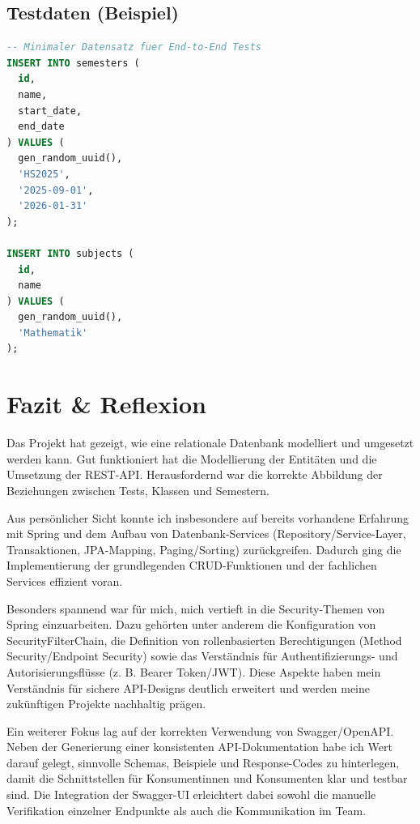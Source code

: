 \documentclass[12pt,a4paper]{article}
\begin{document}
    \subsection{Testdaten (Beispiel)}
    \begin{lstlisting}[language=SQL]
-- Minimaler Datensatz fuer End-to-End Tests
INSERT INTO semesters (
  id,
  name,
  start_date,
  end_date
) VALUES (
  gen_random_uuid(),
  'HS2025',
  '2025-09-01',
  '2026-01-31'
);

INSERT INTO subjects (
  id,
  name
) VALUES (
  gen_random_uuid(),
  'Mathematik'
);
    \end{lstlisting}

    \section{Fazit \& Reflexion}
    Das Projekt hat gezeigt, wie eine relationale Datenbank modelliert und umgesetzt werden kann.
    Gut funktioniert hat die Modellierung der Entitäten und die Umsetzung der REST-API.
    Herausfordernd war die korrekte Abbildung der Beziehungen zwischen Tests, Klassen und Semestern.

    Aus persönlicher Sicht konnte ich insbesondere auf bereits vorhandene Erfahrung mit Spring und
    dem Aufbau von Datenbank-Services (Repository/Service-Layer, Transaktionen, JPA-Mapping,
    Paging/Sorting) zurückgreifen. Dadurch ging die Implementierung der grundlegenden CRUD-Funktionen
    und der fachlichen Services effizient voran.

    Besonders spannend war für mich, mich vertieft in die Security-Themen von Spring einzuarbeiten.
    Dazu gehörten unter anderem die Konfiguration von SecurityFilterChain, die Definition von
    rollenbasierten Berechtigungen (Method Security/Endpoint Security) sowie das Verständnis für
    Authentifizierungs- und Autorisierungsflüsse (z. B. Bearer Token/JWT). Diese Aspekte haben mein
    Verständnis für sichere API-Designs deutlich erweitert und werden meine zukünftigen Projekte
    nachhaltig prägen.

    Ein weiterer Fokus lag auf der korrekten Verwendung von Swagger/OpenAPI. Neben der Generierung
    einer konsistenten API-Dokumentation habe ich Wert darauf gelegt, sinnvolle Schemas, Beispiele
    und Response-Codes zu hinterlegen, damit die Schnittstellen für Konsumentinnen und Konsumenten
    klar und testbar sind. Die Integration der Swagger-UI erleichtert dabei sowohl die manuelle
    Verifikation einzelner Endpunkte als auch die Kommunikation im Team.
\end{document}
